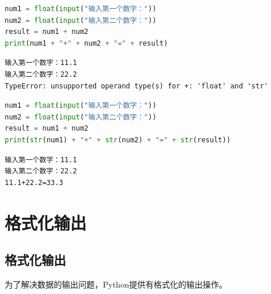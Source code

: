 
\begin{lstlisting}[language=Python]
num1 = float(input("输入第一个数字："))
num2 = float(input("输入第二个数字："))
result = num1 + num2
print(num1 + "+" + num2 + "=" + result)
\end{lstlisting}

\begin{tcolorbox}
	\begin{verbatim}
输入第一个数字：11.1
输入第二个数字：22.2
TypeError: unsupported operand type(s) for +: 'float' and 'str'
\end{verbatim}
\end{tcolorbox}

\vspace{0.5cm}


\begin{lstlisting}[language=Python]
num1 = float(input("输入第一个数字："))
num2 = float(input("输入第二个数字："))
result = num1 + num2
print(str(num1) + "+" + str(num2) + "=" + str(result))
\end{lstlisting}

\begin{tcolorbox}
	\begin{verbatim}
输入第一个数字：11.1
输入第二个数字：22.2
11.1+22.2=33.3
\end{verbatim}
\end{tcolorbox}

\newpage

\section{格式化输出}

\subsection{格式化输出}

为了解决数据的输出问题，Python提供有格式化的输出操作。

